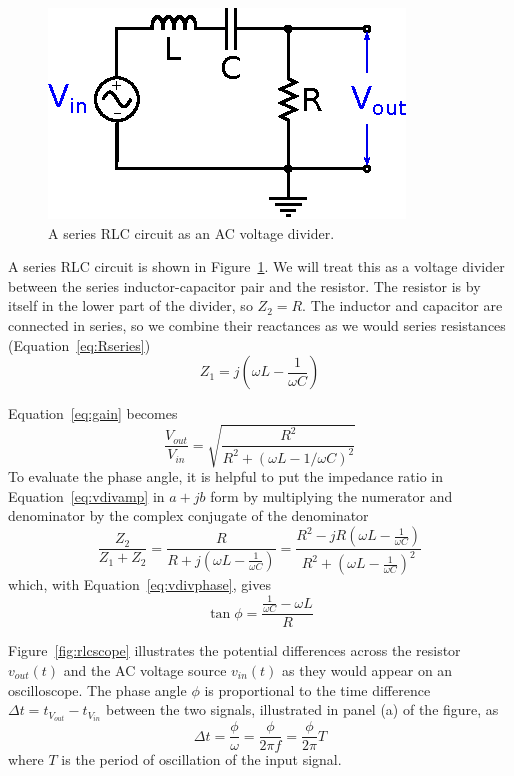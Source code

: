 \documentclass[11pt]{article}
\begin{document}
\begin{figure}[ht]
  \begin{center}
    \includegraphics{rlccircuit.eps}
    \caption{A series RLC circuit as an AC voltage divider.}
    \label{fig:rlccircuit}
  \end{center}
\end{figure}

A series RLC circuit is shown in Figure~\ref{fig:rlccircuit}. We will
treat this as a voltage divider between the series inductor-capacitor
pair and the resistor. The resistor is by itself in the lower part of
the divider, so $Z_2 = R$. The inductor and capacitor are connected in
series, so we combine their reactances as we would series resistances
(Equation~\ref{eq:Rseries})
\begin{equation}
  Z_1 = j \left( \omega L - \frac{1}{\omega C} \right)
\end{equation}

Equation~\ref{eq:gain} becomes
\begin{equation}
  \frac{V_{out}}{V_{in}} = \sqrt{\frac{R^2}{R^2 + (\omega L - 1/\omega C)^2}}
\end{equation}
To evaluate the phase angle, it is helpful to put the
impedance ratio in Equation~\ref{eq:vdivamp} in $a + jb$ form by
multiplying the numerator and denominator by the complex conjugate of
the denominator
\begin{equation}
  \frac{Z_2}{Z_1 + Z_2}
  = \frac{R}{R + j \left( \omega L - \frac{1}{\omega C} \right)}
  = \frac{R^2 - j R \left( \omega L - \frac{1}{\omega C} \right)}
         {R^2 + \left( \omega L - \frac{1}{\omega C} \right)^2}
\end{equation}
which, with Equation~\ref{eq:vdivphase}, gives
\begin{equation}
  \tan \phi = \frac{\frac{1}{\omega C} - \omega L}{R}
\end{equation}

Figure~\ref{fig:rlcscope} illustrates the
potential differences across the resistor $v_{out}(t)$ and the AC
voltage source $v_{in}(t)$ as they would appear on an oscilloscope. 
The phase angle $\phi$ is proportional to the time difference $\Delta t =
t_{V_{out}} - t_{V_{in}}$ between the two signals, illustrated in
panel (a) of the figure, as 
\begin{equation}
  \Delta t = \frac{\phi}{\omega} = \frac{\phi}{2 \pi f} = \frac{\phi}{2 \pi} T
  \label{eq:deltatphi}
\end{equation}
where $T$ is the period of oscillation of the input signal.
\end{document}
